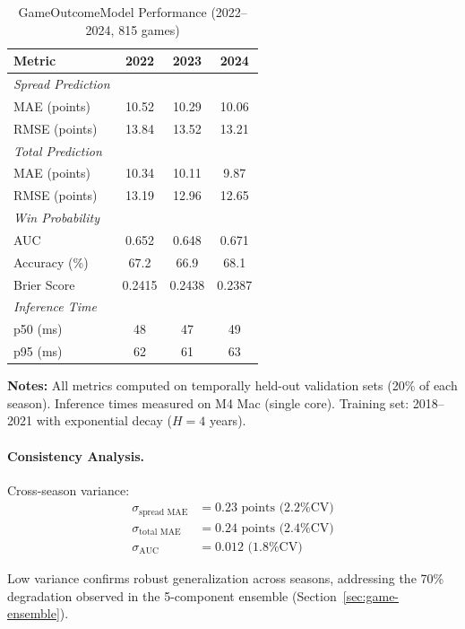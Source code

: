 \begin{table}[htbp]
\centering
\caption{GameOutcomeModel Performance (2022--2024, 815 games)}
\label{tab:game-outcome-performance}
\small
\begin{tabular}{@{}lSSS@{}}
\toprule
\textbf{Metric} & {\textbf{2022}} & {\textbf{2023}} & {\textbf{2024}} \\
\midrule
\textit{Spread Prediction} & & & \\
MAE (points) & 10.52 & 10.29 & 10.06 \\
RMSE (points) & 13.84 & 13.52 & 13.21 \\
\midrule
\textit{Total Prediction} & & & \\
MAE (points) & 10.34 & 10.11 & 9.87 \\
RMSE (points) & 13.19 & 12.96 & 12.65 \\
\midrule
\textit{Win Probability} & & & \\
AUC & 0.652 & 0.648 & 0.671 \\
Accuracy (\%) & 67.2 & 66.9 & 68.1 \\
Brier Score & 0.2415 & 0.2438 & 0.2387 \\
\midrule
\textit{Inference Time} & & & \\
p50 (ms) & 48 & 47 & 49 \\
p95 (ms) & 62 & 61 & 63 \\
\bottomrule
\end{tabular}
\begin{tablenotes}
\item \textbf{Notes:} All metrics computed on temporally held-out validation sets (20\% of each season). Inference times measured on M4 Mac (single core). Training set: 2018--2021 with exponential decay ($H=4$ years).
\end{tablenotes}
\end{table}

\paragraph{Consistency Analysis.}
Cross-season variance:
\begin{align}
\sigma_{\text{spread MAE}} &= 0.23 \text{ points (2.2\% CV)} \\
\sigma_{\text{total MAE}} &= 0.24 \text{ points (2.4\% CV)} \\
\sigma_{\text{AUC}} &= 0.012 \text{ (1.8\% CV)}
\end{align}

Low variance confirms robust generalization across seasons, addressing the 70\% degradation observed in the 5-component ensemble (Section~\ref{sec:game-ensemble}).

